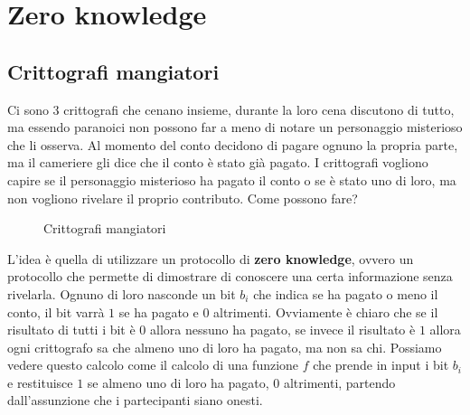 \chapter{Zero knowledge}
\section{Crittografi mangiatori}
Ci sono 3 crittografi che cenano insieme, durante la loro cena discutono di tutto, ma essendo 
paranoici non possono far a meno di notare un personaggio misterioso che li osserva. Al momento 
del conto decidono di pagare ognuno la propria parte, ma il cameriere gli dice che il conto è
stato già pagato. I crittografi vogliono capire se il personaggio misterioso ha pagato il conto
o se è stato uno di loro, ma non vogliono rivelare il proprio contributo. Come possono fare?
\begin{figure}[H]
  \centering
  \caption{Crittografi mangiatori}
\end{figure}
L'idea è quella di utilizzare un protocollo di \textbf{zero knowledge}, ovvero un protocollo che
permette di dimostrare di conoscere una certa informazione senza rivelarla. Ognuno di loro 
nasconde un bit $b_i$ che indica se ha pagato o meno il conto, il bit varrà $1$ se ha pagato e $0$
altrimenti. 
Ovviamente è chiaro che se il risultato di tutti i bit è $0$ allora nessuno ha pagato, se invece
il risultato è $1$ allora ogni crittografo sa che almeno uno di loro ha pagato, ma non sa chi. Possiamo vedere 
questo calcolo come il calcolo di una funzione $f$ che prende in input i bit $b_i$ e restituisce
$1$ se almeno uno di loro ha pagato, $0$ altrimenti, partendo dall'assunzione che i partecipanti siano
onesti.

